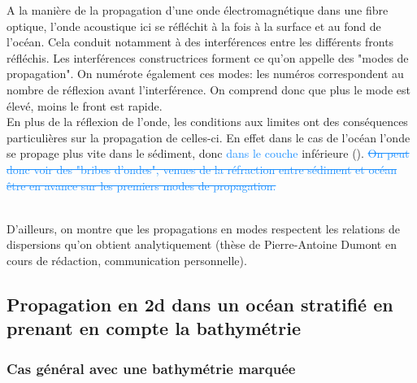 \documentclass{rapportECC}
\newcommand{\FAadd}[1]{\textcolor{DodgerBlue}{{#1}}}                     %
\newcommand{\FAdel}[1]{\textcolor{DodgerBlue}{\sout{#1}}}                %
\begin{document}
A la manière de la propagation d'une onde électromagnétique dans une fibre optique, l'onde acoustique ici se réfléchit à la fois à la surface et au fond de l'océan. Cela conduit notamment à des interférences entre les différents fronts réfléchis. Les interférences constructrices forment ce qu'on appelle des "modes de propagation". On numérote également ces modes: les numéros correspondent au nombre de réflexion avant l'interférence. On comprend donc que plus le mode est élevé, moins le front est rapide.\\
En plus de la réflexion de l'onde, les conditions aux limites ont des conséquences particulières sur la propagation de celles-ci. En effet dans le cas de l'océan l'onde se propage plus vite dans le sédiment, donc \FAadd{dans le couche} inférieure (\cite{CL_acous_2015}). \FAdel{On peut donc voir des "bribes d'ondes", venues de la réfraction entre sédiment et océan être en avance sur les premiers modes de propagation.}


\\
D'ailleurs, on montre que les propagations en modes respectent les relations de dispersions qu'on obtient analytiquement (thèse de Pierre-Antoine Dumont en cours de rédaction, communication personnelle).

\subsection{Propagation en 2d dans un océan stratifié en prenant en compte la bathymétrie}


\subsubsection{Cas général avec une bathymétrie marquée}
\end{document}
